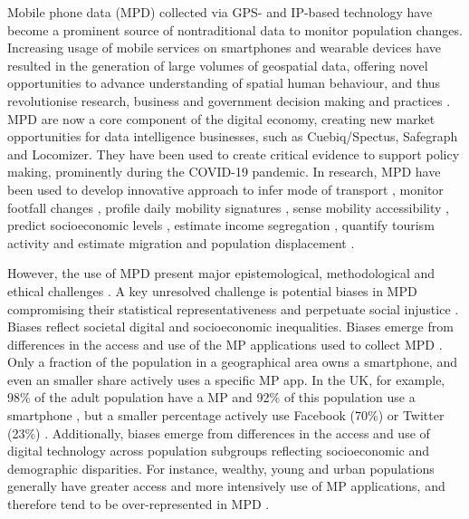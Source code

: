 \documentclass[]{rsos}%
\begin{document}
Mobile phone data (MPD) collected via GPS- and IP-based technology have
become a prominent source of nontraditional data to monitor population
changes. Increasing usage of mobile services on smartphones and wearable
devices have resulted in the generation of large volumes of geospatial
data, offering novel opportunities to advance understanding of spatial
human behaviour, and thus revolutionise research, business and
government decision making and practices \citep{rowe23-bigdata}. MPD are now
a core component of the digital economy, creating new market
opportunities for data intelligence businesses, such as Cuebiq/Spectus,
Safegraph and Locomizer. They have been used to create critical evidence
to support policy making, prominently during the COVID-19 pandemic. In
research, MPD have been used to develop innovative approach to infer
mode of transport \citep{graells-garrido2023}, monitor footfall changes
\citep{ballantyne2022, hunter2021}, profile daily mobility signatures
\citep{cabrera-arnau2023}, sense mobility accessibility
\citep{graells-garrido2021}, predict socioeconomic levels \citep{soto2011, blumenstock2015}, estimate income segregation \citep{moro2021}, quantify
tourism activity \citep{raun2016} and estimate migration \citep{cepal24, gonzález-leonardo2025} and population displacement \citep{rowe2022, iradukunda2025}.

However, the use of MPD present major epistemological, methodological
and ethical challenges \citep{rowe23-bigdata}. A key unresolved challenge is
potential biases in MPD compromising their statistical
representativeness and perpetuate social injustice
\citep{wesolowski13-biases}. Biases reflect societal digital and
socioeconomic inequalities. Biases emerge from differences in the access
and use of the MP applications used to collect MPD
\citep{porter2012, wesolowski13-biases}. Only a fraction of the population
in a geographical area owns a smartphone, and even an smaller share
actively uses a specific MP app. In the UK, for example, 98\%
of the adult population have a MP and 92\% of this population
use a smartphone \citep{ofcom23}, but a smaller percentage actively use
Facebook (70\%) or Twitter (23\%) \citep{statista24}. Additionally, biases
emerge from differences in the access and use of digital technology
across population subgroups reflecting socioeconomic and demographic
disparities. For instance, wealthy, young and urban populations
generally have greater access and more intensively use of MP
applications, and therefore tend to be over-represented in MPD
\citep{blumenstock2010, wesolowski13-biases, schlosser21-biases}.
\end{document}
